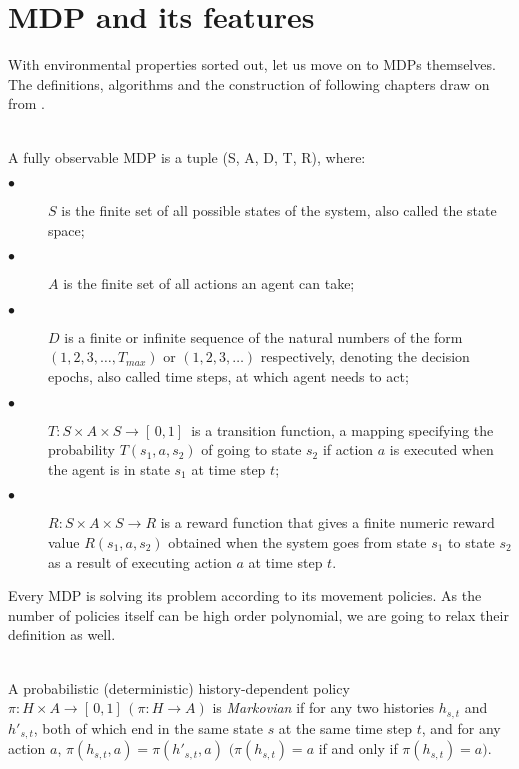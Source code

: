 \section{MDP and its features}
With environmental properties sorted out, let us move on to MDPs themselves. \\
The definitions, algorithms and the construction of following chapters draw on from \cite{Kolobov2012}. 
  \\ \\

\begin{definition}\label{def:MDP}
A fully observable MDP is a tuple (S, A, D, T, R), where:
\begin{description}
  \item[$\bullet$ ] $S$ is the finite set of all possible states of the system, also called the state space;
  \item[$\bullet$ ] $A$ is the finite set of all actions an agent can take;
  \item[$\bullet$ ] $D$ is a finite or infinite sequence of the natural numbers of the form $(1, 2, 3, \ldots, T_{max})$ or $(1, 2, 3, \ldots)$ respectively, 
        denoting the decision epochs, also called time steps, at which agent needs to act;
  \item[$\bullet$ ] $T : S \times A \times S \rightarrow [ \,0, 1] \,$ is a transition function, a mapping specifying the probability $T(s_1, a, s_2)$ of going to state $s_2$ if action $a$ is executed when the agent is in state $s_1$ at time step $t$;
  \item[$\bullet$ ] $R : S \times A \times S \rightarrow R$ is a reward function that gives a finite numeric reward value $R(s_1, a, s_2)$ obtained when the system goes from state $s_1$ to state $s_2$ as a result of executing action $a$ at time step $t$.
\end{description}

\end{definition}

Every MDP is solving its problem according to its movement policies. As the number of policies itself can be high order polynomial, we are going to relax their definition as well.
\\ \\
\begin{definition}
A probabilistic (deterministic) history-dependent policy $\pi: H \times A \rightarrow [ \,0, 1] \,(\pi: H \rightarrow A)$ is \textit{Markovian} if for any two histories $h_{s,t}$ and $h'_{s,t}$, both of which end in the same state $s$ at the same time step $t$, and for any action $a$, 
$\pi(h_{s,t}, a) = \pi(h'_{s,t}, a)$ $(\pi(h_{s,t}) = a$ if and only if $\pi(h_{s,t}) = a)$.
\end{definition}

